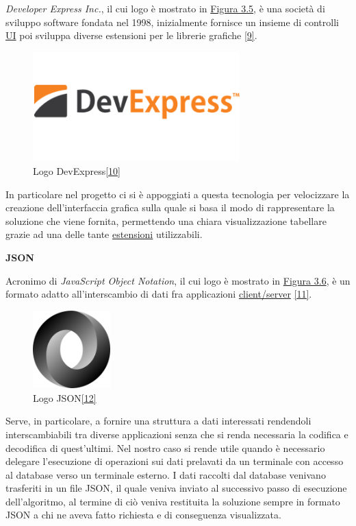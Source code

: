 \textit{Developer Express Inc.}, il cui logo è mostrato in \hyperref[dev-exp]{Figura 3.5}, è una società di sviluppo software fondata nel 1998, inizialmente fornisce un insieme di controlli 
\hyperref[UI]{UI\glo} poi sviluppa diverse estensioni per le librerie grafiche \hyperref[devexpress]{[9]}.

\begin{figure}[H]
	\includegraphics[width=8cm]{immagini/devexpress.png}
	\centering
	\caption{Logo DevExpress\hyperref[devlogo]{[10]}}
	\label{dev-exp}
\end{figure}

In particolare nel progetto ci si è appoggiati a questa tecnologia per velocizzare la creazione dell'interfaccia grafica sulla quale si basa il modo di rappresentare la soluzione
che viene fornita, permettendo una chiara visualizzazione tabellare grazie ad una delle tante \hyperref[Estensioni]{estensioni\glo} utilizzabili. 

\newpage

\textbf{JSON}

Acronimo di \textit{JavaScript Object Notation}, il cui logo è mostrato in \hyperref[js]{Figura 3.6}, è un formato adatto
all'interscambio di dati fra applicazioni \hyperref[Client/Server]{client/server\glo} \hyperref[json]{[11]}.

\begin{figure}[H]
	\includegraphics[width=3cm]{immagini/json.png}
	\centering
	\caption{Logo JSON\hyperref[jlogo]{[12]}}
	\label{js}
\end{figure}

Serve, in particolare, a fornire una struttura a dati interessati rendendoli interscambiabili tra diverse applicazioni senza che si renda necessaria la codifica e decodifica di quest'ultimi.
Nel nostro caso si rende utile quando è necessario delegare l'esecuzione di operazioni sui dati prelavati da un terminale con accesso al database verso un terminale esterno.
I dati raccolti dal database venivano trasferiti in un file JSON, il quale veniva inviato al successivo passo di esecuzione dell'algoritmo, al termine di ciò veniva restituita
la soluzione sempre in formato JSON a chi ne aveva fatto richiesta e di conseguenza visualizzata.\\

